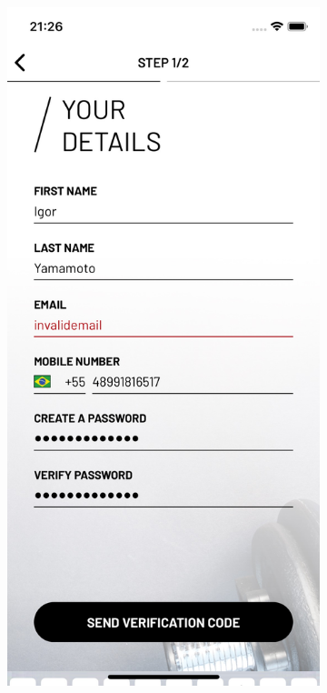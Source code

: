 \begin{figure}[H]
	\centering
    \begin{subfigure}[b]{0.4\textwidth}
        \includegraphics[width=\textwidth]{pfc/figuras/email-not-valid-field.png}

\end{subfigure}
\end{figure}
